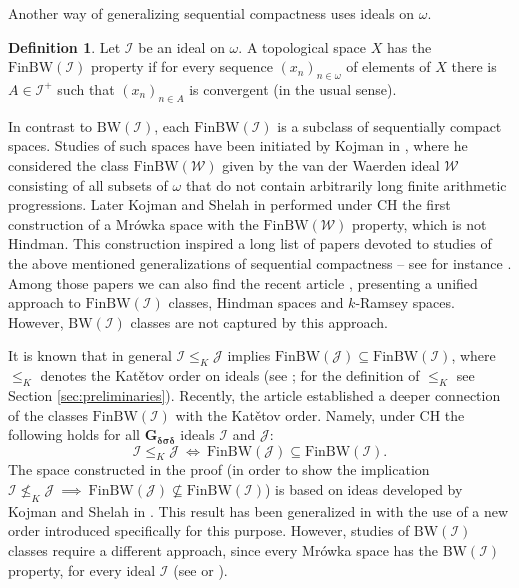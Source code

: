 \documentclass{amsart}
\theoremstyle{plain}
\theoremstyle{definition}
\newtheorem{definition}[theorem]{Definition}
\theoremstyle{remark}
\newcommand{\cI}{\mathcal{I}}
\newcommand{\I}{\cI}
\newcommand{\cJ}{\mathcal{J}}
\newcommand{\J}{\cJ}
\newcommand{\cW}{\mathcal{W}}
\newcommand{\BW}{\mathrm{BW}}
\newcommand{\FinBW}{\mathrm{FinBW}}
\begin{document}
Another way of generalizing sequential compactness uses ideals on $\omega$.

\begin{definition}
Let $\I$ be an ideal on $\omega$. A topological space $X$ has the $\FinBW(\I)$ property if for every sequence $(x_n)_{n\in \omega}$ of elements of $X$ there is $A\in\I^+$ such that $(x_n)_{n\in A}$ is convergent (in the usual sense).
\end{definition}

In contrast to $\BW(\I)$, each $\FinBW(\I)$ is a subclass of sequentially compact spaces. Studies of such spaces have been initiated by Kojman in \cite{Kojman}, where he considered the class $\FinBW(\cW)$ given by the van der Waerden ideal $\cW$ consisting of all subsets of $\omega$ that do not contain arbitrarily long finite arithmetic progressions. Later Kojman and Shelah in \cite{KojmanShelah} performed under CH the first construction of a Mr\'{o}wka space with the $\FinBW(\cW)$ property, which is not Hindman. This construction inspired a long list of papers devoted to studies of the above mentioned generalizations of sequential compactness -- see for instance \cite{MR3097000, MR4356195, FT, MR2471564, MR2052425, MR4358658, MR4584767}. Among those papers we can also find the recent article \cite{FKK23}, presenting a unified approach to $\FinBW(\I)$ classes, Hindman spaces and $k$-Ramsey spaces. However, $\BW(\I)$ classes are not captured by this approach.

It is known that in general $\I\leq_K\J$ implies $\FinBW(\J)\subseteq\FinBW(\I)$, where $\leq_K$ denotes the Kat\v{e}tov order on ideals (see \cite[Corollary 10.2]{MR4584767}; for the definition of $\leq_K$ see Section \ref{sec:preliminaries}). Recently, the article \cite{MR4584767} established a deeper connection of the classes $\FinBW(\I)$ with the Kat\v{e}tov order. Namely, under CH the following holds for all $\mathbf{G_{\delta\sigma\delta}}$ ideals $\I$ and $\J$:
$$\I\leq_K\J\ \iff\ \FinBW(\J)\subseteq\FinBW(\I).$$
The space constructed in the proof (in order to show the implication $\I\not\leq_K\J\ \implies\ \FinBW(\J)\not\subseteq\FinBW(\I)$) is based on ideas developed by Kojman and Shelah in \cite{KojmanShelah}. This result has been generalized in \cite{FKK23} with the use of a new order introduced specifically for this purpose. However, studies of $\BW(\I)$ classes require a different approach, since every Mr\'{o}wka space has the $\BW(\I)$ property, for every ideal $\I$ (see \cite[Theorem 2.1]{FT} or \cite[Theorem 2.2]{MR3097000}).
\end{document}
